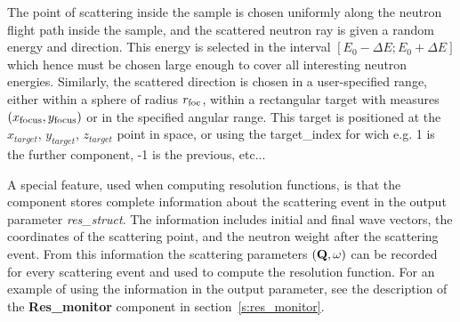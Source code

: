 The point of scattering inside the sample is chosen uniformly
along the neutron flight path inside the sample, and the scattered
neutron ray is given a random energy and direction. This energy is selected in
the interval $[E_0-\Delta E; E_0+\Delta E]$ which hence must be
chosen large enough to cover all interesting neutron energies. 
Similarly, the scattered
direction is chosen in a user-specified range,
either within a sphere of radius $r_{\rm foc}$, within a rectangular
target with measures $(x_{\rm focus}, y_{\rm focus})$
or in the specified angular range. This target is positioned at the $x_{target}$, $y_{target}$, $z_{target}$ point in space, or using the target\_index for wich e.g. 1 is the further component, -1 is the previous, etc...

A special feature, used when computing resolution functions, is that the
component stores complete information about the scattering event in the
output parameter \textit{res\_struct}. The information includes initial
and final wave vectors, the coordinates of the scattering point, and the
neutron weight after the scattering event. From this information the
scattering parameters $({\bf Q}, \omega)$ can be recorded
for every scattering event and used to compute the resolution function.
For an example of using the
information in the output parameter, see the description of the
\textbf{Res\_monitor} component in section~\ref{s:res_monitor}.

